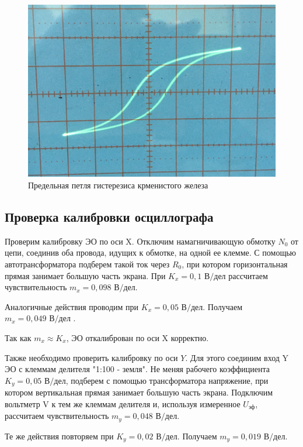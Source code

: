 \documentclass[a4paper,11pt]{extarticle} %
\begin{document}
\begin{figure}[H]
    \centering
    \includegraphics[width = 15 cm]{Кремнистое.JPG}
    \caption{Предельная петля гистерезиса крменистого железа}
\end{figure}



\subsection{Проверка калибровки осциллографа}

Проверим калибровку ЭО по оси X. Отключим намагничивающую обмотку $N_0$ от цепи, соединив оба провода, идущих к обмотке, на одной ее клемме. С помощью автотрансформатора подберем такой ток через $R_0$, при котором горизонтальная прямая занимает большую часть экрана. При $ K_x=0,1 \text{ В/дел} $ рассчитаем чувствительность $m_x=0,098 \text{ В/дел}$.

Аналогичные действия проводим при $ K_x =0,05 \text{ В/дел} $. Получаем $ m_x=0,049 \text{ В/дел} $  .

Так как $m_x \approx K_x$, ЭО откалиброван по оси X корректно.

Также необходимо проверить калибровку по оси $ Y $. Для этого соединим вход Y ЭО с клеммам делителя "1:100 - земля". Не меняя рабочего коэффициента $K_y = 0,05\text{ В/дел}$, подберем с помощью трансформатора напряжение, при котором вертикальная прямая занимает большую часть экрана. Подключим вольтметр V к тем же клеммам делителя и, используя измеренное $U_{\text{эф}}$, рассчитаем чувствительность $m_y=0,048\text{ В/дел}$.

Те же действия повторяем при $K_y = 0,02\text{ В/дел}$. Получаем $m_y=0,019\text{ В/дел}$.
\end{document}
